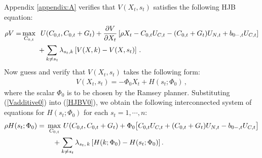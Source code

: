 \documentclass[12pt]{article}
\newcommand{\WJ}[1]{{\textcolor{red}{#1}}}
\begin{document}
{Appendix \ref{appendix:A}} verifies that $V(X_t, s_t)$ satisfies the following HJB equation: 
\begin{align}\label{HJBV0} 
	\rho V = &   \max_{C_{0, t}} \;\; U(C_{0, t}, C_{0, t}+G_t) 
	+ \frac{\partial V }{\partial X_t} \left[\rho X_t- C_{0, t} U_{C, t}-(C_{0, t}+G_t) U_{N, t}+b_{0-, t} U_{C, t} \right]   \notag \\
	& \quad\quad \,\, +\sum_{k\neq s_t} \lambda_{s_t, k}\left[V(X, k)-V(X, s_t) \right]	 \, . 
\end{align} 
%
%
Now guess and  verify that $V(X_t, s_t)$ takes the following  form:
\begin{eqnarray}\label{Vadditive0} 
	V(X_t, s_t)=-\Phi_0 X_t+H(s_t; \Phi_0)\, ,
\end{eqnarray}
where the scalar  $\Phi_0$ is to be chosen by the Ramsey planner. 
Substituting (\ref{Vadditive0}) into  (\ref{HJBV0}), we obtain %
the following interconnected system of equations for $H(s_t; \Phi_0)$ for each $s_t=1, \cdots, n$: 
\begin{align}\label{HJBH00} %
	\rho H(s_t; \Phi_0)  = &\;
	\max_{C_{0, t}} \, U(C_{0, t},C_{0, t}+G_t) 
	+ \Phi_0 \big[C_{0, t} U_{C, t}+(C_{0, t}+G_t) U_{N, t}-b_{0-, t} U_{C, t} \big]  \notag\\
	& \quad\,	+\sum_{k\neq s_t}\lambda_{s_t , \, k}\left[ {H(k; \Phi_0)}-H(s_t; \Phi_0) \right].
\end{align}
\end{document}

